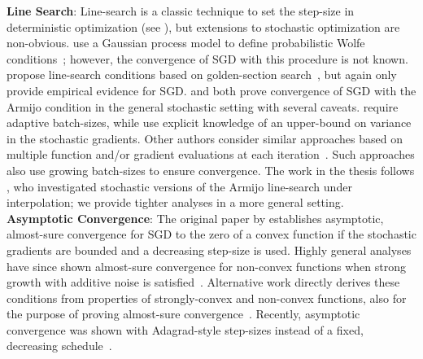 \noindent \textbf{Line Search}:
Line-search is a classic technique to set the step-size in deterministic optimization (see \citet{nocedal1999numerical}), but extensions to stochastic optimization are non-obvious. 
\citet{mahsereci2017pls} use a Gaussian process model to define probabilistic Wolfe conditions~\citep{wolfe1969convergence, wolfe1971convergence}; however, the convergence of \ac{SGD} with this procedure is not known.
\citet{fridovich2019choosing} propose line-search conditions based on golden-section search~\citep{avriel1968golden}, but again only provide empirical evidence for \ac{SGD}. 
\citet{paquette2020stochastic} and \citet{ogaltsov2019adaptive} both prove convergence of \ac{SGD} with the Armijo condition in the general stochastic setting with several caveats. 
\citet{paquette2020stochastic} require adaptive batch-sizes, while \citet{ogaltsov2019adaptive} use explicit knowledge of an upper-bound on variance in the stochastic gradients. 
Other authors consider similar approaches based on multiple function and/or gradient evaluations at each iteration~\citep{friedlander2012hybrid, byrd2012sample, de2016big, krejic2013line}.
Such approaches also use growing batch-sizes to ensure convergence.
The work in the thesis follows \citet{vaswani2019painless}, who investigated stochastic versions of the Armijo line-search under interpolation; we provide tighter analyses in a more general setting.\\ 


\noindent \textbf{Asymptotic Convergence}:
The original paper by \citet{robbins1951sgd} establishes asymptotic, almost-sure convergence for \ac{SGD} to the zero of a convex function if the stochastic gradients are bounded and a decreasing step-size is used.
Highly general analyses have since shown almost-sure convergence for non-convex functions when strong growth with additive noise is satisfied~\citep{bertsekas2000gradient, bottou1991approche}.
Alternative work directly derives these conditions from properties of strongly-convex and non-convex functions, also for the purpose of proving almost-sure convergence~\citep{nguyen2018sgd, lei2019stochastic}.
Recently, asymptotic convergence was shown with Adagrad-style step-sizes instead of a fixed, decreasing schedule~\citep{li2019convergence}.


\endinput
